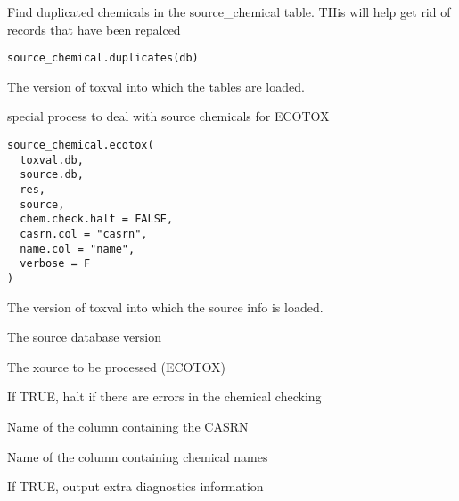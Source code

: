 \documentclass[letterpaper]{book}
\begin{document}
%
\begin{Description}\relax
Find duplicated chemicals in the source\_chemical table. THis will help get rid of
records that have been repalced
\end{Description}
%
\begin{Usage}
\begin{verbatim}
source_chemical.duplicates(db)
\end{verbatim}
\end{Usage}
%
\begin{Arguments}
\begin{ldescription}
\item[\code{db}] The version of toxval into which the tables are loaded.
\end{ldescription}
\end{Arguments}
%
\begin{Description}\relax
special process to deal with source chemicals for ECOTOX
\end{Description}
%
\begin{Usage}
\begin{verbatim}
source_chemical.ecotox(
  toxval.db,
  source.db,
  res,
  source,
  chem.check.halt = FALSE,
  casrn.col = "casrn",
  name.col = "name",
  verbose = F
)
\end{verbatim}
\end{Usage}
%
\begin{Arguments}
\begin{ldescription}
\item[\code{toxval.db}] The version of toxval into which the source info is loaded.

\item[\code{source.db}] The source database version

\item[\code{source}] The xource to be processed (ECOTOX)

\item[\code{chem.check.halt}] If TRUE, halt if there are errors in the chemical checking

\item[\code{casrn.col}] Name of the column containing the CASRN

\item[\code{name.col}] Name of the column containing chemical names

\item[\code{verbose}] If TRUE, output extra diagnostics information
\end{ldescription}
\end{Arguments}
\end{document}
